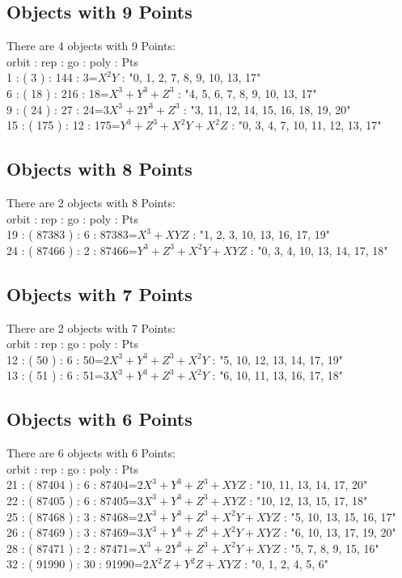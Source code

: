 \documentclass[12pt]{article}
\begin{document}
{\subsection*{Objects with 9 Points}
There are 4 objects with 9 Points: \\
orbit : rep : go : poly : Pts\\
1 : ( 3 ) : 144 : 3=$X^2Y$ : "0, 1, 2, 7, 8, 9, 10, 13, 17"\\
6 : ( 18 ) : 216 : 18=$X^3 + Y^3 + Z^3$ : "4, 5, 6, 7, 8, 9, 10, 13, 17"\\
9 : ( 24 ) : 27 : 24=$3X^3 + 2Y^3 + Z^3$ : "3, 11, 12, 14, 15, 16, 18, 19, 20"\\
15 : ( 175 ) : 12 : 175=$Y^3 + Z^3 + X^2Y + X^2Z$ : "0, 3, 4, 7, 10, 11, 12, 13, 17"\\
\subsection*{Objects with 8 Points}
There are 2 objects with 8 Points: \\
orbit : rep : go : poly : Pts\\
19 : ( 87383 ) : 6 : 87383=$X^3 + XYZ$ : "1, 2, 3, 10, 13, 16, 17, 19"\\
24 : ( 87466 ) : 2 : 87466=$Y^3 + Z^3 + X^2Y + XYZ$ : "0, 3, 4, 10, 13, 14, 17, 18"\\
\subsection*{Objects with 7 Points}
There are 2 objects with 7 Points: \\
orbit : rep : go : poly : Pts\\
12 : ( 50 ) : 6 : 50=$2X^3 + Y^3 + Z^3 + X^2Y$ : "5, 10, 12, 13, 14, 17, 19"\\
13 : ( 51 ) : 6 : 51=$3X^3 + Y^3 + Z^3 + X^2Y$ : "6, 10, 11, 13, 16, 17, 18"\\
\subsection*{Objects with 6 Points}
There are 6 objects with 6 Points: \\
orbit : rep : go : poly : Pts\\
21 : ( 87404 ) : 6 : 87404=$2X^3 + Y^3 + Z^3 + XYZ$ : "10, 11, 13, 14, 17, 20"\\
22 : ( 87405 ) : 6 : 87405=$3X^3 + Y^3 + Z^3 + XYZ$ : "10, 12, 13, 15, 17, 18"\\
25 : ( 87468 ) : 3 : 87468=$2X^3 + Y^3 + Z^3 + X^2Y + XYZ$ : "5, 10, 13, 15, 16, 17"\\
26 : ( 87469 ) : 3 : 87469=$3X^3 + Y^3 + Z^3 + X^2Y + XYZ$ : "6, 10, 13, 17, 19, 20"\\
28 : ( 87471 ) : 2 : 87471=$X^3 + 2Y^3 + Z^3 + X^2Y + XYZ$ : "5, 7, 8, 9, 15, 16"\\
32 : ( 91990 ) : 30 : 91990=$2X^2Z + Y^2Z + XYZ$ : "0, 1, 2, 4, 5, 6"\\
}
\end{document}
